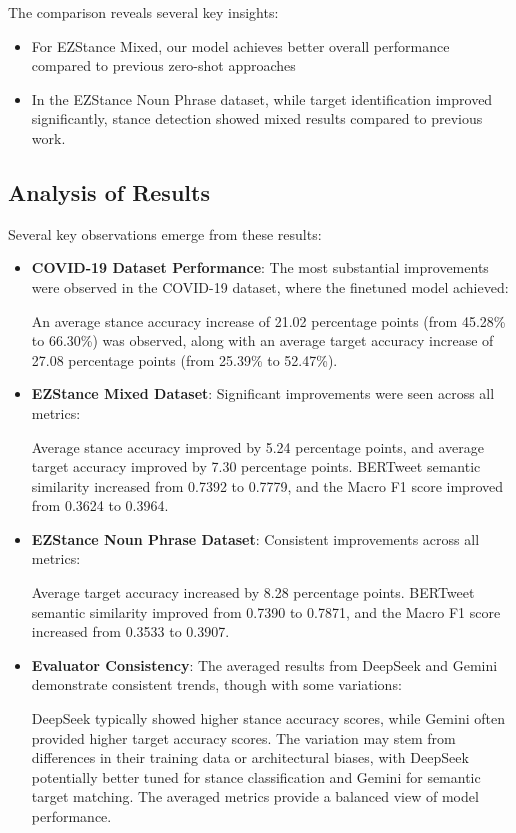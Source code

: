 \documentclass[twocolumn,11pt,letterpaper]{article}
\begin{document}
The comparison reveals several key insights:
\begin{itemize}
    \item For EZStance Mixed, our model achieves better overall performance compared to previous zero-shot approaches
    \item In the EZStance Noun Phrase dataset, while target identification improved significantly, stance detection showed mixed results compared to previous work.
\end{itemize}

\subsection{Analysis of Results}
Several key observations emerge from these results:

\begin{itemize}
    \item \textbf{COVID-19 Dataset Performance}: The most substantial improvements were observed in the COVID-19 dataset, where the finetuned model achieved: 
    
    An average stance accuracy increase of 21.02 percentage points (from 45.28\% to 66.30\%) was observed, along with an average target accuracy increase of 27.08 percentage points (from 25.39\% to 52.47\%).
    
    \item \textbf{EZStance Mixed Dataset}: Significant improvements were seen across all metrics: 
    
    Average stance accuracy improved by 5.24 percentage points, and average target accuracy improved by 7.30 percentage points. BERTweet semantic similarity increased from 0.7392 to 0.7779, and the Macro F1 score improved from 0.3624 to 0.3964.
    
    \item \textbf{EZStance Noun Phrase Dataset}: Consistent improvements across all metrics: 
    
    Average target accuracy increased by 8.28 percentage points. BERTweet semantic similarity improved from 0.7390 to 0.7871, and the Macro F1 score increased from 0.3533 to 0.3907.
    
    \item \textbf{Evaluator Consistency}: The averaged results from DeepSeek and Gemini demonstrate consistent trends, though with some variations: 
    
    DeepSeek typically showed higher stance accuracy scores, while Gemini often provided higher target accuracy scores. The variation may stem from differences in their training data or architectural biases, with DeepSeek potentially better tuned for stance classification and Gemini for semantic target matching. The averaged metrics provide a balanced view of model performance.
\end{itemize}
\end{document}
